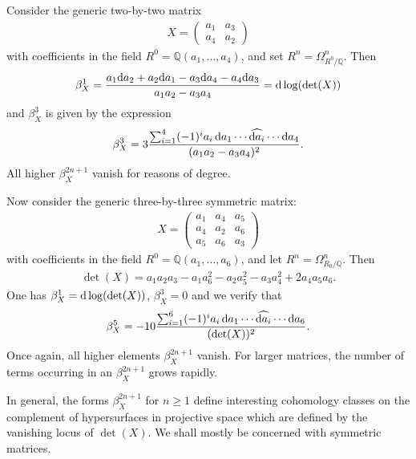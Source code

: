\documentclass[pdftex]{sigma}%
\numberwithin{equation}{section}
\newcommand{\Q}{\mathbb Q}
\newcommand{\0}{\color{blue}{\mathsf{0}}}
\begin{document}
\begin{Example} \label{examples: smallbetas} Consider the generic two-by-two matrix
\begin{gather*} X= \begin{pmatrix}
a_{1} & a_{3}\\
a_{4} & a_{2}
\end{pmatrix}
\end{gather*}
with coefficients in the field $R^0 =\Q(a_{1},\dots, a_4)$, and set $R^n = \Omega^n_{R^0/\Q}$. Then
\begin{gather*}
\beta^1_X = \frac{ a_1 {\rm d}a_2 +a_2 {\rm d}a_1 -a_3 {\rm d}a_4 -a_4 {\rm d}a_3 }{a_1a_2-a_3a_4} =
{\rm d} \log ( \det(X))
\end{gather*}
and $\beta^3_X$ is given by the expression
\begin{gather*}
 \beta^3_X = 3 \frac{ \sum_{i=1}^4 (-1)^i a_i \, {\rm d}a_1 \cdots \widehat{{\rm d}a_i} \cdots {\rm d}a_4 }{ (a_1a_2-a_3a_4)^2}.
 \end{gather*}
All higher $\beta^{2n+1}_X$ vanish for reasons of degree.



Now consider the generic three-by-three symmetric matrix:
\begin{gather*}
X= \begin{pmatrix}
a_{1} & a_{4} & a_5\\
a_{4} & a_{2} & a_6 \\
a_5 & a_6 & a_3
\end{pmatrix}
\end{gather*}
with coefficients in the field $R^0 =\Q(a_1,\dots, a_6)$, and let $R^n = \Omega^n_{R_0/\Q}$. Then
\begin{gather*}
\det(X)= a_1a_2a_3-a_1a_6^2-a_2a_5^2-a_3a_4^2+2 a_4a_5a_6.
\end{gather*}
One has $\beta^1_X = {\rm d} \log (\det (X))$,
$\beta^3_X=0$ and we verify that
\begin{gather*}
\beta^5_X = -10 \frac{ \sum_{i=1}^6 (-1)^i a_i \, {\rm d}a_1 \cdots \widehat{{\rm d}a_i} \cdots {\rm d}a_6 }{ (\det(X))^2}.
\end{gather*}
Once again, all higher elements $\beta^{2n+1}_X$ vanish. For larger matrices, the number of terms occurring in an $\beta^{2n+1}_X$ grows rapidly.
\end{Example}


In general, the forms $\beta^{2n+1}_X$ for $n\geq 1$ define interesting cohomology classes on the complement of hypersurfaces in projective space which are defined by the vanishing locus of $\det(X)$. We shall mostly be concerned with symmetric matrices.
\end{document}
